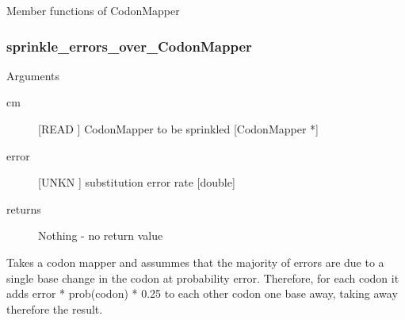 Member functions of CodonMapper

\subsubsection{sprinkle_errors_over_CodonMapper}

Arguments
\begin{description}
\item[cm] [READ ] CodonMapper to be sprinkled [CodonMapper *]
\item[error] [UNKN ] substitution error rate [double]
\item[returns] Nothing - no return value
\end{description}
Takes a codon mapper and assummes that the majority of errors
are due to a single base change in the codon at probability error.
Therefore, for each codon it adds error * prob(codon) * 0.25 to each 
other codon one base away, taking away therefore the result.




